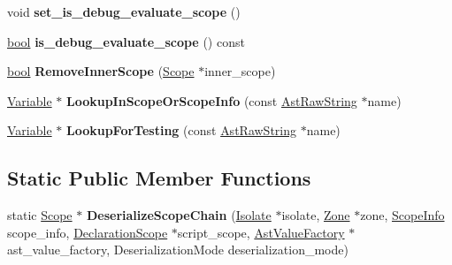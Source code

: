 \begin{DoxyCompactItemize}
\item 
\mbox{\label{classv8_1_1internal_1_1Scope_ac39693bdb8feb7b12c005940a3238b5c}} 
void {\bfseries set\+\_\+is\+\_\+debug\+\_\+evaluate\+\_\+scope} ()
\item 
\mbox{\label{classv8_1_1internal_1_1Scope_a5d38060a93a4edf55cc81fac4fe3c746}} 
\mbox{\hyperlink{classbool}{bool}} {\bfseries is\+\_\+debug\+\_\+evaluate\+\_\+scope} () const
\item 
\mbox{\label{classv8_1_1internal_1_1Scope_a548cccb448c84d86ff3d463c79d02931}} 
\mbox{\hyperlink{classbool}{bool}} {\bfseries Remove\+Inner\+Scope} (\mbox{\hyperlink{classv8_1_1internal_1_1Scope}{Scope}} $\ast$inner\+\_\+scope)
\item 
\mbox{\label{classv8_1_1internal_1_1Scope_a63de717232eec964e62ff1302ac59792}} 
\mbox{\hyperlink{classv8_1_1internal_1_1Variable}{Variable}} $\ast$ {\bfseries Lookup\+In\+Scope\+Or\+Scope\+Info} (const \mbox{\hyperlink{classv8_1_1internal_1_1AstRawString}{Ast\+Raw\+String}} $\ast$name)
\item 
\mbox{\label{classv8_1_1internal_1_1Scope_ac229e127552f9aa5f9effc0f1c8735e0}} 
\mbox{\hyperlink{classv8_1_1internal_1_1Variable}{Variable}} $\ast$ {\bfseries Lookup\+For\+Testing} (const \mbox{\hyperlink{classv8_1_1internal_1_1AstRawString}{Ast\+Raw\+String}} $\ast$name)
\end{DoxyCompactItemize}
\subsection*{Static Public Member Functions}
\begin{DoxyCompactItemize}
\item 
\mbox{\label{classv8_1_1internal_1_1Scope_a92933c6d383163294ae44bfc38bb64da}} 
static \mbox{\hyperlink{classv8_1_1internal_1_1Scope}{Scope}} $\ast$ {\bfseries Deserialize\+Scope\+Chain} (\mbox{\hyperlink{classv8_1_1internal_1_1Isolate}{Isolate}} $\ast$isolate, \mbox{\hyperlink{classv8_1_1internal_1_1Zone}{Zone}} $\ast$zone, \mbox{\hyperlink{classv8_1_1internal_1_1ScopeInfo}{Scope\+Info}} scope\+\_\+info, \mbox{\hyperlink{classv8_1_1internal_1_1DeclarationScope}{Declaration\+Scope}} $\ast$script\+\_\+scope, \mbox{\hyperlink{classv8_1_1internal_1_1AstValueFactory}{Ast\+Value\+Factory}} $\ast$ast\+\_\+value\+\_\+factory, Deserialization\+Mode deserialization\+\_\+mode)
\end{DoxyCompactItemize}
